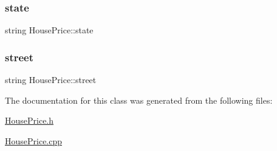 \subsubsection{\texorpdfstring{state}{state}}
{\footnotesize\ttfamily string House\+Price\+::state\hspace{0.3cm}{\ttfamily [private]}}

\mbox{\label{class_house_price_abceda72673b6c6c9e10c571407cdf3c2}} 
\subsubsection{\texorpdfstring{street}{street}}
{\footnotesize\ttfamily string House\+Price\+::street\hspace{0.3cm}{\ttfamily [private]}}



The documentation for this class was generated from the following files\+:\begin{DoxyCompactItemize}
\item 
\hyperlink{_house_price_8h}{House\+Price.\+h}\item 
\hyperlink{_house_price_8cpp}{House\+Price.\+cpp}\end{DoxyCompactItemize}
